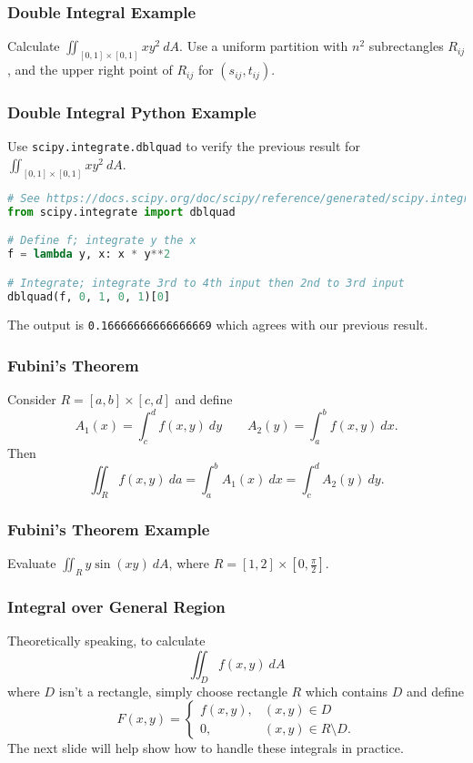 \documentclass{beamer}
\begin{document}
\begin{frame}[t]
\frametitle{Double Integral Example}
\begin{Example}
Calculate $\displaystyle\iint_{[0,1]\times[0, 1]} xy^2\ dA$. Use a uniform partition with $n^2$ subrectangles $R_{ij}$, and the upper right point of $R_{ij}$ for $(s_{ij}, t_{ij})$.
\end{Example}
\end{frame}

\begin{frame}[fragile]
\frametitle{Double Integral Python Example}
\small
\begin{Example}
Use \texttt{scipy.integrate.dblquad} to verify the previous result for $\displaystyle\iint_{[0,1]\times[0, 1]} xy^2\ dA$.
\end{Example}
\begin{lstlisting}[language=Python]
# See https://docs.scipy.org/doc/scipy/reference/generated/scipy.integrate.dblquad.html
from scipy.integrate import dblquad

# Define f; integrate y the x
f = lambda y, x: x * y**2

# Integrate; integrate 3rd to 4th input then 2nd to 3rd input
dblquad(f, 0, 1, 0, 1)[0]
\end{lstlisting}
The output is \texttt{0.16666666666666669} which agrees with our previous result. 

\end{frame}

\begin{frame}
\frametitle{Fubini's Theorem}
\begin{Theorem}[Fubini]
Consider $R = [a, b]\times [c, d]$ and define
$$
A_1(x) = \int_c^d f(x, y)\ dy\qquad A_2(y) = \int_a^b f(x, y)\ dx.
$$
Then
$$
\iint_R f(x, y)\ da = \int_a^b A_1(x)\ dx = \int_c^d A_2(y)\ dy.
$$
\end{Theorem}
\end{frame}

\begin{frame}[t]
\frametitle{Fubini's Theorem Example}
\begin{Example}
Evaluate $\displaystyle\iint_R y\sin(xy)\ dA$, where $R = [1, 2]\times \left[0, \frac{\pi}{2}\right]$.
\end{Example}

\end{frame}

\begin{frame}
\frametitle{Integral over General Region}
Theoretically speaking, to calculate
$$
\iint_D f(x, y)\ dA
$$
where $D$ isn't a rectangle, simply choose rectangle $R$ which contains $D$ and define
$$
F(x, y) = \begin{cases} f(x, y),	&	(x, y)\in D\\ 0,	&	(x,y)\in R\setminus D.\end{cases}
$$
The next slide will help show how to handle these integrals in practice. 
\end{frame}
\end{document}
